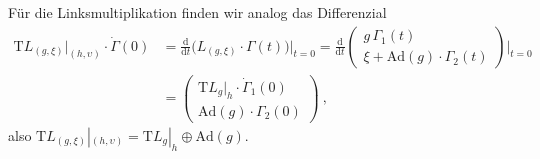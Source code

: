 \documentclass[10pt,a4paper]{article}
\theoremstyle{mytheorem}
\theoremstyle{mydefinition}
\newcommand{\dt}{\mathrm{d}}
\newcommand{\Tt}{\mathrm{T}}
\newcommand{\Ad}{\mathrm{Ad}}
\begin{document}
Für die Linksmultiplikation finden wir analog das Differenzial
\begin{align*}
	\Tt L_{(g,\xi)}|_{(h,\upsilon)}
	\cdot
	\dot{\Gamma}(0)
	&=
	\frac{\dt}{\dt t}
	\big(
		L_{(g,\xi)}\cdot\Gamma(t)
	\big)
	\Big|_{t=0}
	=
	\frac{\dt}{\dt t}
	\begin{pmatrix}
		g\,\Gamma_1(t) \\
		\xi + \Ad(g)\cdot\Gamma_2(t)
	\end{pmatrix}
	\Big|_{t=0}
	\nonumber\\
	&=	
	\begin{pmatrix}
		\Tt L_g|_h\cdot\dot{\Gamma}_1(0) \\
		\Ad(g)\cdot{\Gamma}_2(0)
	\end{pmatrix}
	\ ,
\end{align*}
also $\Tt L_{(g,\xi)}|_{(h,\upsilon)}=\Tt L_g|_h\oplus\Ad(g)$.
\end{document}
